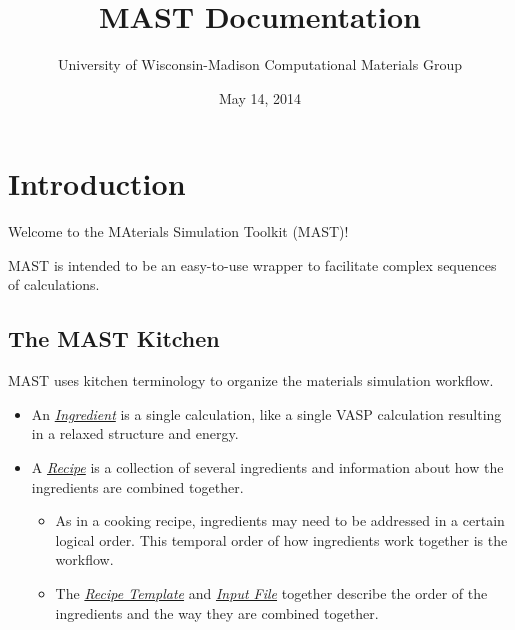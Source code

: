 \documentclass[letterpaper,10pt,english]{sphinxmanual}
\title{MAST Documentation}
\date{May 14, 2014}
\author{University of Wisconsin-Madison Computational Materials Group}
\begin{document}
\maketitle
\tableofcontents
{}\label{index::doc}



\chapter{Introduction}
\label{0_0_introduction:introduction}\label{0_0_introduction::doc}\label{0_0_introduction:materials-simulation-toolkit-mast-manual}
Welcome to the MAterials Simulation Toolkit (MAST)!

MAST is intended to be an easy-to-use wrapper to facilitate complex sequences of calculations.


\section{The MAST Kitchen}
\label{0_0_introduction:the-mast-kitchen}
MAST uses kitchen terminology to organize the materials simulation workflow.
\begin{itemize}
\item {} 
An {\hyperref[2_0_ingredients::doc]{\emph{Ingredient}}} is a single calculation, like a single VASP calculation resulting in a relaxed structure and energy.

\item {} 
A {\hyperref[4_0_recipe::doc]{\emph{Recipe}}} is a collection of several ingredients and information about how the ingredients are combined together.
\begin{itemize}
\item {} 
As in a cooking recipe, ingredients may need to be addressed in a certain logical order. This temporal order of how ingredients work together is the workflow.

\item {} 
The {\hyperref[4_0_recipe::doc]{\emph{Recipe Template}}} and {\hyperref[3_0_inputfile::doc]{\emph{Input File}}} together describe the order of the ingredients and the way they are combined together.

\end{itemize}

\end{itemize}
\end{document}
